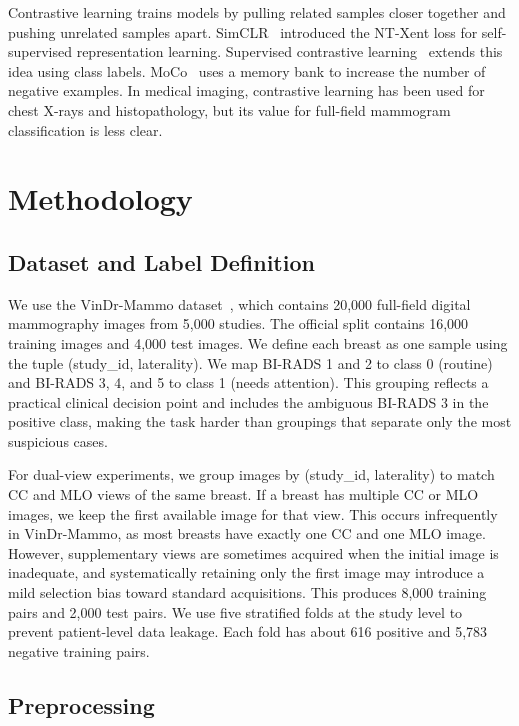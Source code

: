 \documentclass[runningheads]{llncs}
\begin{document}
Contrastive learning trains models by pulling related samples closer together and pushing unrelated samples apart. SimCLR~\cite{chen2020simclr} introduced the NT-Xent loss for self-supervised representation learning. Supervised contrastive learning~\cite{khosla2020supcon} extends this idea using class labels. MoCo~\cite{he2020moco} uses a memory bank to increase the number of negative examples. In medical imaging, contrastive learning has been used for chest X-rays and histopathology, but its value for full-field mammogram classification is less clear.

\section{Methodology}
\label{sec:method}

\subsection{Dataset and Label Definition}

We use the VinDr-Mammo dataset~\cite{nguyen2023vindr}, which contains 20,000 full-field digital mammography images from 5,000 studies. The official split contains 16,000 training images and 4,000 test images. We define each breast as one sample using the tuple (study\_id, laterality). We map BI-RADS 1 and 2 to class 0 (routine) and BI-RADS 3, 4, and 5 to class 1 (needs attention). This grouping reflects a practical clinical decision point and includes the ambiguous BI-RADS 3 in the positive class, making the task harder than groupings that separate only the most suspicious cases.

For dual-view experiments, we group images by (study\_id, laterality) to match CC and MLO views of the same breast. If a breast has multiple CC or MLO images, we keep the first available image for that view. This occurs infrequently in VinDr-Mammo, as most breasts have exactly one CC and one MLO image. However, supplementary views are sometimes acquired when the initial image is inadequate, and systematically retaining only the first image may introduce a mild selection bias toward standard acquisitions. This produces 8,000 training pairs and 2,000 test pairs. We use five stratified folds at the study level to prevent patient-level data leakage. Each fold has about 616 positive and 5,783 negative training pairs.

\subsection{Preprocessing}
\end{document}
